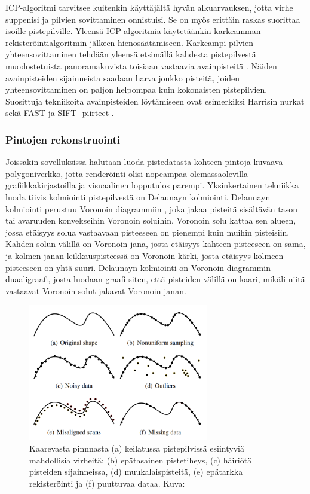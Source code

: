 
ICP-algoritmi tarvitsee kuitenkin käyttäjältä hyvän alkuarvauksen, jotta virhe suppenisi ja pilvien sovittaminen onnistuisi. Se on myös erittäin raskas suorittaa isoille pistepilville. Yleensä ICP-algoritmia käytetäänkin karkeamman rekisteröintialgoritmin jälkeen hienosäätämiseen. Karkeampi pilvien yhteensovittaminen tehdään yleensä etsimällä kahdesta pistepilvestä muodostetuista panoramakuvista toisiaan vastaavia avainpisteitä . Näiden avainpisteiden sijainneista saadaan harva joukko pisteitä, joiden yhteensovittaminen on paljon helpompaa kuin kokonaisten pistepilvien. Suosittuja tekniikoita avainpisteiden löytämiseen ovat esimerkiksi Harrisin nurkat \cite{harris} sekä FAST ja SIFT -piirteet \cite{fast}\cite{sift}. \cite{weinmann}


\subsubsection{Pintojen rekonstruointi}

Joissakin sovelluksissa halutaan luoda pistedatasta kohteen pintoja kuvaava polygoniverkko, jotta renderöinti olisi nopeampaa olemassaolevilla grafiikkakirjastoilla ja visuaalinen lopputulos parempi. Yksinkertainen tekniikka luoda tiivis kolmiointi pistepilvestä on Delaunayn kolmiointi. Delaunayn kolmiointi perustuu Voronoin diagrammiin , joka jakaa pisteitä sisältävän tason tai avaruuden konvekseihin Voronoin soluihin. Voronoin solu kattaa sen alueen, jossa etäisyys solua vastaavaan pisteeseen on pienempi kuin muihin pisteisiin. Kahden solun välillä on Voronoin jana, josta etäisyys kahteen pisteeseen on sama, ja kolmen janan leikkauspisteessä on Voronoin kärki, josta etäisyys kolmeen pisteeseen on yhtä suuri. Delaunayn kolmiointi on Voronoin diagrammin duaaligraafi, josta luodaan graafi siten, että pisteiden välillä on kaari, mikäli niitä vastaavat Voronoin solut jakavat Voronoin janan. \cite{delaunay}

\begin{figure}
    \centering
    \includegraphics[width=0.7\textwidth]{img/artifacts.png}
    \caption{Kaarevasta pinnnasta (a) keilatussa pistepilvissä esiintyviä mahdollisia virheitä: (b) epätasainen pistetiheys, (c) häiriötä pisteiden sijainneissa, (d) muukalaispisteitä, (e) epätarkka rekisteröinti ja (f) puuttuvaa dataa. Kuva: \cite{berger}}
    \label{img:artifacts}
\end{figure}

